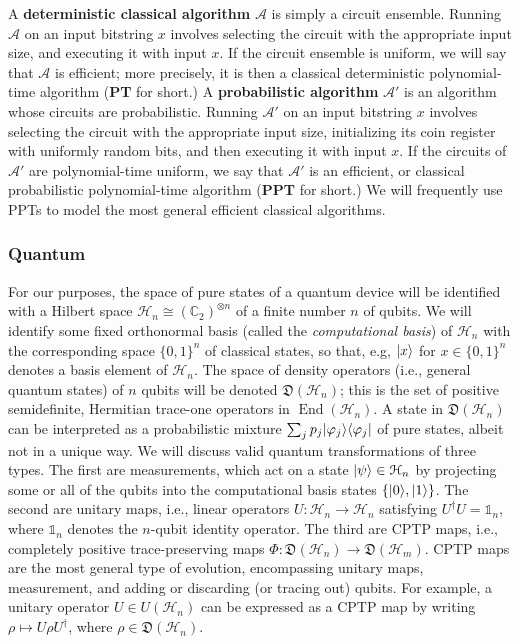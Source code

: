 \documentclass[envcountsame]{llncs}
\numberwithin{equation}{section}
\newcommand{\one}{\mathds 1}
\DeclareMathOperator{\End}{End}
\newcommand{\C}{\mathbb{C}}
\newcommand{\algo}{\mathcal}
\newcommand{\states}{\mathfrak D}
\begin{document}
A \textbf{deterministic classical algorithm} $\algo A$ is simply a circuit ensemble. Running $\algo A$ on an input bitstring $x$ involves selecting the circuit with the appropriate input size, and executing it with input $x$. If the circuit ensemble is uniform, we will say that $\algo A$ is efficient; more precisely, it is then a classical deterministic polynomial-time algorithm (\textbf{PT} for short.) A \textbf{probabilistic algorithm} $\algo A'$ is an algorithm whose circuits are probabilistic. Running $\algo A'$ on an input bitstring $x$ involves selecting the circuit with the appropriate input size, initializing its coin register with uniformly random bits, and then executing it with input $x$. If the circuits of $\algo A'$ are polynomial-time uniform, we say that $\algo A'$ is an efficient, or classical probabilistic polynomial-time algorithm (\textbf{PPT} for short.) We will frequently use PPTs to model the most general efficient classical algorithms.

\subsubsection{Quantum}

For our purposes, the space of pure states of a quantum device will be identified with a Hilbert space $\mathcal H_n \cong (\C_2)^{\otimes n}$ of a finite number $n$ of qubits. We will identify some fixed orthonormal basis (called the \emph{computational basis}) of $\mathcal H_n$ with the corresponding space $\{0, 1\}^n$ of classical states, so that, e.g, ${\left\vert{x}\right\rangle}$ for $x \in \{0, 1\}^n$ denotes a basis element of $\mathcal H_n$. The space of density operators (i.e., general quantum states) of $n$ qubits will be denoted $\states (\mathcal H_n)$; this is the set of positive semidefinite, Hermitian trace-one operators in $\End(\mathcal H_n)$. A state in $\states (\mathcal H_n)$ can be interpreted as a probabilistic mixture $\sum_j p_j {\left\vert{\varphi_j}\right\rangle}{\left\langle{\varphi_j}\right\vert}$ of pure states, albeit not in a unique way. We will discuss valid quantum transformations of three types. The first are measurements, which act on a state ${\left\vert{\psi}\right\rangle} \in \mathcal H_n$ by projecting some or all of the qubits into the computational basis states $\{{\left\vert{0}\right\rangle}, {\left\vert{1}\right\rangle}\}$. The second are unitary maps, i.e., linear operators $U: \mathcal H_n \rightarrow \mathcal H_n$ satisfying $U^\dagger U = \one_n$, where $\one_n$ denotes the $n$-qubit identity operator. The third are CPTP maps, i.e., completely positive trace-preserving maps $\Phi : \states (\mathcal H_n) \rightarrow \states (\mathcal H_m)$. CPTP maps are the most general type of evolution, encompassing unitary maps, measurement, and adding or discarding (or tracing out) qubits. For example, a unitary operator $U \in U(\mathcal H_n)$ can be expressed as a CPTP map by writing $\rho \mapsto U\rho U^\dagger$, where $\rho \in \states (\mathcal H_n)$.
\end{document}
